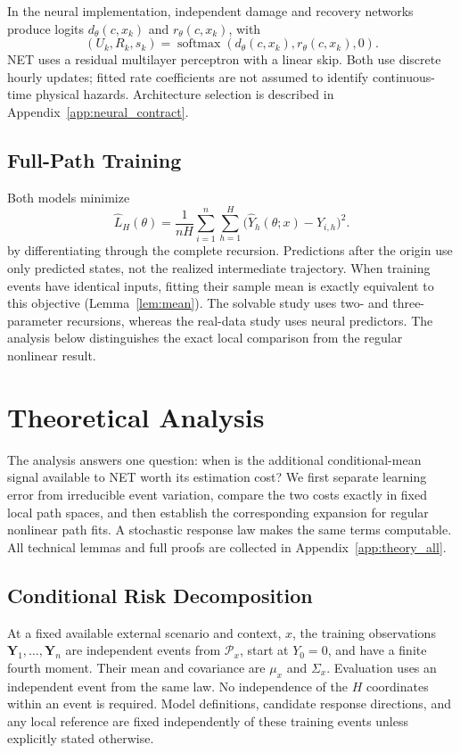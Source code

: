 In the neural implementation, independent damage and recovery networks produce logits $d_\theta(c,x_k)$ and $r_\theta(c,x_k)$, with
\[
 (U_k,R_k,s_k)=\operatorname{softmax}\!\left(d_\theta(c,x_k),r_\theta(c,x_k),0\right).
\]
NET uses a residual multilayer perceptron with a linear skip. Both use discrete hourly updates; fitted rate coefficients are not assumed to identify continuous-time physical hazards. Architecture selection is described in Appendix~\ref{app:neural_contract}.

\subsection{Full-Path Training}
Both models minimize
\begin{equation}
 \widehat L_H(\theta)
 =\frac1{nH}\sum_{i=1}^n\sum_{h=1}^H
 \bigl(\widehat Y_h(\theta;x)-Y_{i,h}\bigr)^2.
 \label{eq:training}
\end{equation}
by differentiating through the complete recursion. Predictions after the origin use only predicted states, not the realized intermediate trajectory. When training events have identical inputs, fitting their sample mean is exactly equivalent to this objective (Lemma~\ref{lem:mean}). The solvable study uses two- and three-parameter recursions, whereas the real-data study uses neural predictors. The analysis below distinguishes the exact local comparison from the regular nonlinear result.

\section{Theoretical Analysis}
\label{sec:theory}
The analysis answers one question: when is the additional conditional-mean signal available to NET worth its estimation cost? We first separate learning error from irreducible event variation, compare the two costs exactly in fixed local path spaces, and then establish the corresponding expansion for regular nonlinear path fits. A stochastic response law makes the same terms computable. All technical lemmas and full proofs are collected in Appendix~\ref{app:theory_all}.

\subsection{Conditional Risk Decomposition}
\begin{assumption}
\label{ass:event}
At a fixed available external scenario and context, $x$, the training observations $\mathbf Y_1,\ldots,\mathbf Y_n$ are independent events from $\mathcal P_x$, start at $Y_0=0$, and have a finite fourth moment. Their mean and covariance are $\mu_x$ and $\Sigma_x$. Evaluation uses an independent event from the same law. No independence of the $H$ coordinates within an event is required. Model definitions, candidate response directions, and any local reference are fixed independently of these training events unless explicitly stated otherwise.
\end{assumption}

